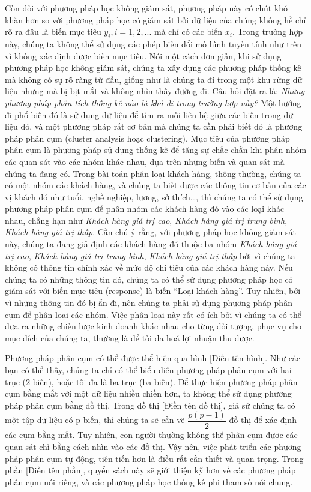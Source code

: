 \documentclass[
]{article}
\begin{document}
Còn đối với phương pháp học không giám sát, phương pháp này có chút khó khăn hơn so với phương pháp học có giám sát bởi dữ liệu của chúng không hề chỉ rõ ra đâu là biến mục tiêu \(y_i, i = 1,2,...\) mà chỉ có các biến \(x_i\). Trong trường hợp này, chúng ta không thể sử dụng các phép biến đổi mô hình tuyến tính như trên vì không xác định được biến mục tiêu. Nói một cách đơn giản, khi sử dụng phương pháp học không giám sát, chúng ta xây dựng các phương pháp thống kê mà không có sự rõ ràng từ đầu, giống như là chúng ta đi trong một khu rừng dữ liệu nhưng mà bị bịt mắt và không nhìn thấy đường đi. Câu hỏi đặt ra là: \emph{Những phương pháp phân tích thống kê nào là khả dĩ trong trường hợp này?} Một hướng đi phổ biến đó là sử dụng dữ liệu để tìm ra mối liên hệ giữa các biến trong dữ liệu đó, và một phương pháp rất cơ bản mà chúng ta cần phải biết đó là phương pháp phân cụm (cluster analysis hoặc clustering). Mục tiêu của phương pháp phân cụm là phương pháp sử dụng thống kê để tăng sự chắc chắn khi phân nhóm các quan sát vào các nhóm khác nhau, dựa trên những biến và quan sát mà chúng ta đang có. Trong bài toán phân loại khách hàng, thông thường, chúng ta có một nhóm các khách hàng, và chúng ta biết được các thông tin cơ bản của các vị khách đó như tuổi, nghề nghiệp, lương, sở thích\ldots, thì chúng ta có thể sử dụng phương pháp phân cụm để phân nhóm các khách hàng đó vào các loại khác nhau, chẳng hạn như \emph{Khách hàng giá trị cao}, \emph{Khách hàng giá trị trung bình}, \emph{Khách hàng giá trị thấp}. Cần chú ý rằng, với phương pháp học không giám sát này, chúng ta đang giả định các khách hàng đó thuộc ba nhóm \emph{Khách hàng giá trị cao}, \emph{Khách hàng giá trị trung bình}, \emph{Khách hàng giá trị thấp} bởi vì chúng ta không có thông tin chính xác về mức độ chi tiêu của các khách hàng này. Nếu chúng ta có những thông tin đó, chúng ta có thể sử dụng phương pháp học có giám sát với biến mục tiêu (response) là biến ``Loại khách hàng''. Tuy nhiên, bởi vì những thông tin đó bị ẩn đi, nên chúng ta phải sử dụng phương pháp phân cụm để phân loại các nhóm. Việc phân loại này rất có ích bởi vì chúng ta có thể đưa ra những chiến lược kinh doanh khác nhau cho từng đối tượng, phục vụ cho mục đích của chúng ta, thường là để tối đa hoá lợi nhuận thu được.

Phương pháp phân cụm có thể được thể hiện qua hình {[}Điền tên hình{]}. Như các bạn có thể thấy, chúng ta chỉ có thể biểu diễn phương pháp phân cụm với hai trục (2 biến), hoặc tối đa là ba trục (ba biến). Để thực hiện phương pháp phân cụm bằng mắt với một dữ liệu nhiều chiền hơn, ta không thể sử dụng phương pháp phân cụm bằng đồ thị. Trong đồ thị {[}Điền tên đồ thị{]}, giả sử chúng ta có một tập dữ liệu có p biến, thì chúng ta sẽ cần vẽ \(\dfrac{p(p-1)}{2}\) đồ thị để xác định các cụm bằng mắt. Tuy nhiên, con người thường không thể phân cụm được các quan sát chỉ bằng cách nhìn vào các đồ thị. Vậy nên, việc phát triển các phương pháp phân cụm tự động, tiên tiến hơn là điều rất cần thiết và quan trọng. Trong phần {[}Điền tên phần{]}, quyển sách này sẽ giới thiệu kỹ hơn về các phương pháp phân cụm nói riêng, và các phương pháp học thống kê phi tham số nói chung.
\end{document}

